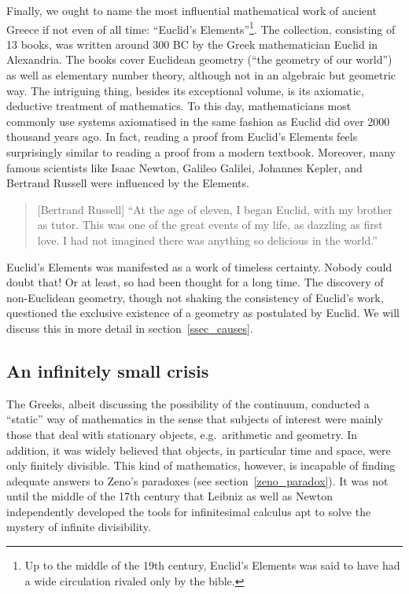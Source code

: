 \documentclass[hidelinks]{article}
\begin{document}
Finally, we ought to name the most influential mathematical work of ancient Greece if not even of all time: ``Euclid's Elements''\footnote{Up to the middle of the 19th century, Euclid's Elements was said to have had a wide circulation rivaled only by the bible.}. 
The collection, consisting of 13 books, was written around 300 BC by the Greek mathematician Euclid in Alexandria. The books cover Euclidean geometry (``the geometry of our world'') as well as elementary number theory, although not in an algebraic but geometric way. The intriguing thing, besides its exceptional volume, is its axiomatic, deductive treatment of mathematics. To this day, mathematicians most commonly use systems axiomatised in the same fashion as Euclid did over 2000 thousand years ago. In fact, reading a proof from Euclid's Elements feels surprisingly similar to reading a proof from a modern textbook. Moreover, many famous scientists like Isaac Newton, Galileo Galilei, Johannes Kepler, and Bertrand Russell were influenced by the Elements.
\begin{quote}[Bertrand Russell]
	``At the age of eleven, I began Euclid, with my brother as tutor. This was one of the great events of my life, as dazzling as first love. I had not imagined there was anything so delicious in the world.''\cite{russell_autobiography}
\end{quote}
Euclid's Elements was manifested as a work of timeless certainty. Nobody could doubt that! Or at least, so had been thought for a long time. The discovery of non-Euclidean geometry, though not shaking the consistency of Euclid's work, questioned the exclusive existence of a geometry as postulated by Euclid. We will discuss this in more detail in section~\ref{ssec_causes}.

\subsection{An infinitely small crisis}
The Greeks, albeit discussing the possibility of the continuum, conducted a ``static'' way of mathematics in the sense that subjects of interest were mainly those that deal with stationary objects, e.g.\ arithmetic and geometry. In addition, it was widely believed that objects, in particular time and space, were only finitely divisible. This kind of mathematics, however, is incapable of finding adequate answers to Zeno's paradoxes (see section~\ref{zeno_paradox}).
It was not until the middle of the 17th century that Leibniz as well as Newton independently developed the tools for infinitesimal calculus apt to solve the mystery of infinite divisibility.
\end{document}
